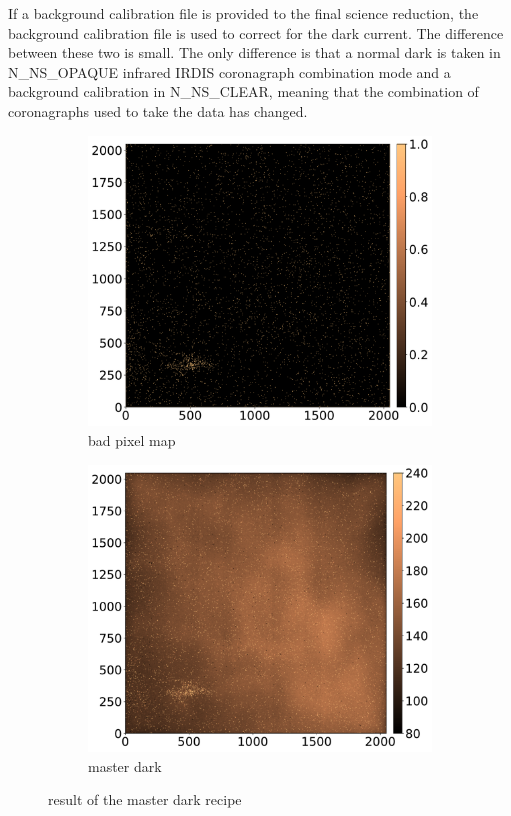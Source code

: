 \documentclass[twoside,single,12pt]{lion-msc}
\begin{document}
If a background calibration file is provided to the final science reduction, the background calibration file is used to correct for the dark current. The difference between these two is small. The only difference is that a normal dark is taken in N\_NS\_OPAQUE infrared IRDIS coronagraph combination mode and a background calibration in N\_NS\_CLEAR, meaning that the combination of coronagraphs used to take the data has changed\cite{Mouillet2013}.

\begin{figure}[!t]
\centering
\begin{subfigure}{.48\textwidth}
  \centering
  \includegraphics[width=1\linewidth]{badpixelmap}
  \caption{bad pixel map}
\end{subfigure}\hfill
\begin{subfigure}{.48\textwidth}
  \centering
  \includegraphics[width=1\linewidth]{dark}
  \caption{master dark}
\end{subfigure}
\caption{result of the master dark recipe}
\label{fig:masterdark}
\end{figure}
\end{document}
